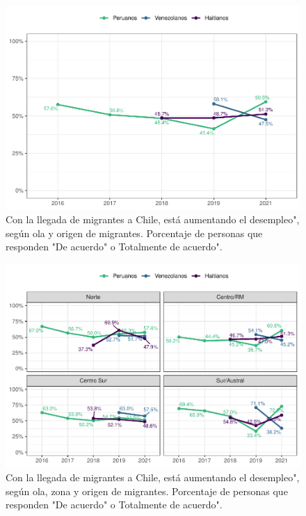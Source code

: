 \documentclass[
  12pt,
  openany]{book}
\begin{document}
\begin{figure}

{\centering \includegraphics{reporte-elsoc_files/figure-latex/amen1-wave-1} 

}

\caption{Con la llegada de migrantes a Chile, está aumentando el desempleo", según ola y origen de migrantes. Porcentaje de personas que responden "De acuerdo" o Totalmente de acuerdo".}\label{fig:amen1-wave}
\end{figure}

\begin{figure}

{\centering \includegraphics{reporte-elsoc_files/figure-latex/amen1-zona-1} 

}

\caption{Con la llegada de migrantes a Chile, está aumentando el desempleo", según ola, zona y origen de migrantes. Porcentaje de personas que responden "De acuerdo" o Totalmente de acuerdo".}\label{fig:amen1-zona}
\end{figure}
\end{document}
